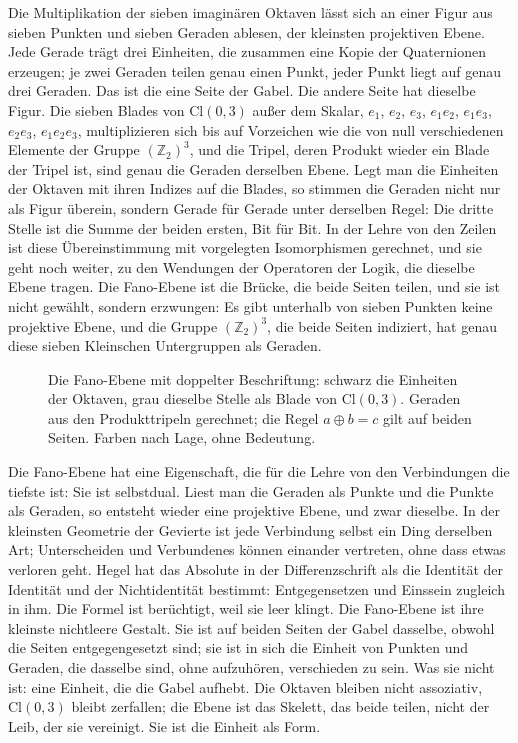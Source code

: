 \documentclass[11pt,a4paper]{article}
\newcommand{\Randlesart}{\marginpar{\raggedright\footnotesize\textcolor{lesart}{$\bigcirc$\,Lesart}}}
\newcommand{\Cl}{\mathrm{Cl}}
\begin{document}
Die Multiplikation der sieben imaginären Oktaven lässt sich an einer Figur aus sieben Punkten und sieben Geraden ablesen, der kleinsten projektiven Ebene. Jede Gerade trägt drei Einheiten, die zusammen eine Kopie der Quaternionen erzeugen; je zwei Geraden teilen genau einen Punkt, jeder Punkt liegt auf genau drei Geraden. Das ist die eine Seite der Gabel. Die andere Seite hat dieselbe Figur. Die sieben Blades von $\Cl(0,3)$ außer dem Skalar, $e_1$, $e_2$, $e_3$, $e_1e_2$, $e_1e_3$, $e_2e_3$, $e_1e_2e_3$, multiplizieren sich bis auf Vorzeichen wie die von null verschiedenen Elemente der Gruppe $(\mathbb Z_2)^3$, und die Tripel, deren Produkt wieder ein Blade der Tripel ist, sind genau die Geraden derselben Ebene. Legt man die Einheiten der Oktaven mit ihren Indizes auf die Blades, so stimmen die Geraden nicht nur als Figur überein, sondern Gerade für Gerade unter derselben Regel: Die dritte Stelle ist die Summe der beiden ersten, Bit für Bit. In der Lehre von den Zeilen ist diese Übereinstimmung mit vorgelegten Isomorphismen gerechnet, und sie geht noch weiter, zu den Wendungen der Operatoren der Logik, die dieselbe Ebene tragen. Die Fano-Ebene ist die Brücke, die beide Seiten teilen, und sie ist nicht gewählt, sondern erzwungen: Es gibt unterhalb von sieben Punkten keine projektive Ebene, und die Gruppe $(\mathbb Z_2)^3$, die beide Seiten indiziert, hat genau diese sieben Kleinschen Untergruppen als Geraden.

\begin{figure}[h]
\centering

\caption[Die Fano-Ebene auf beiden Seiten]{Die Fano-Ebene mit doppelter Beschriftung: schwarz die Einheiten der Oktaven, grau dieselbe Stelle als Blade von $\Cl(0,3)$. Geraden aus den Produkttripeln gerechnet; die Regel $a\oplus b=c$ gilt auf beiden Seiten. Farben nach Lage, ohne Bedeutung.}
\label{fig:fano}
\end{figure}

\Randlesart Die Fano-Ebene hat eine Eigenschaft, die für die Lehre von den Verbindungen die tiefste ist: Sie ist selbstdual. Liest man die Geraden als Punkte und die Punkte als Geraden, so entsteht wieder eine projektive Ebene, und zwar dieselbe. In der kleinsten Geometrie der Gevierte ist jede Verbindung selbst ein Ding derselben Art; Unterscheiden und Verbundenes können einander vertreten, ohne dass etwas verloren geht. Hegel hat das Absolute in der Differenzschrift als die Identität der Identität und der Nichtidentität bestimmt: Entgegensetzen und Einssein zugleich in ihm. Die Formel ist berüchtigt, weil sie leer klingt. Die Fano-Ebene ist ihre kleinste nichtleere Gestalt. Sie ist auf beiden Seiten der Gabel dasselbe, obwohl die Seiten entgegengesetzt sind; sie ist in sich die Einheit von Punkten und Geraden, die dasselbe sind, ohne aufzuhören, verschieden zu sein. Was sie nicht ist: eine Einheit, die die Gabel aufhebt. Die Oktaven bleiben nicht assoziativ, $\Cl(0,3)$ bleibt zerfallen; die Ebene ist das Skelett, das beide teilen, nicht der Leib, der sie vereinigt. Sie ist die Einheit als Form.
\end{document}
